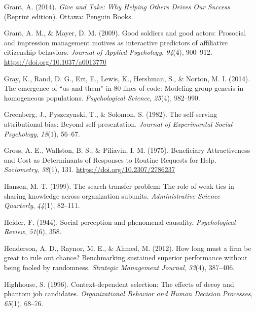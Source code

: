 \documentclass[english,,man]{apa6}
\begin{document}
\leavevmode\hypertarget{ref-grant_give_2014}{}%
Grant, A. (2014). \emph{Give and Take: Why Helping Others Drives Our Success} (Reprint edition). Ottawa: Penguin Books.

\leavevmode\hypertarget{ref-grant_good_2009}{}%
Grant, A. M., \& Mayer, D. M. (2009). Good soldiers and good actors: Prosocial and impression management motives as interactive predictors of affiliative citizenship behaviors. \emph{Journal of Applied Psychology}, \emph{94}(4), 900--912. \url{https://doi.org/10.1037/a0013770}

\leavevmode\hypertarget{ref-gray_emergence_2014}{}%
Gray, K., Rand, D. G., Ert, E., Lewis, K., Hershman, S., \& Norton, M. I. (2014). The emergence of ``us and them'' in 80 lines of code: Modeling group genesis in homogeneous populations. \emph{Psychological Science}, \emph{25}(4), 982--990.

\leavevmode\hypertarget{ref-greenberg_self-serving_1982}{}%
Greenberg, J., Pyszczynski, T., \& Solomon, S. (1982). The self-serving attributional bias: Beyond self-presentation. \emph{Journal of Experimental Social Psychology}, \emph{18}(1), 56--67.

\leavevmode\hypertarget{ref-gross_beneficiary_1975}{}%
Gross, A. E., Wallston, B. S., \& Piliavin, I. M. (1975). Beneficiary Attractiveness and Cost as Determinants of Responses to Routine Requests for Help. \emph{Sociometry}, \emph{38}(1), 131. \url{https://doi.org/10.2307/2786237}

\leavevmode\hypertarget{ref-hansen_search-transfer_1999}{}%
Hansen, M. T. (1999). The search-transfer problem: The role of weak ties in sharing knowledge across organization subunits. \emph{Administrative Science Quarterly}, \emph{44}(1), 82--111.

\leavevmode\hypertarget{ref-heider_social_1944}{}%
Heider, F. (1944). Social perception and phenomenal causality. \emph{Psychological Review}, \emph{51}(6), 358.

\leavevmode\hypertarget{ref-henderson_how_2012}{}%
Henderson, A. D., Raynor, M. E., \& Ahmed, M. (2012). How long must a firm be great to rule out chance? Benchmarking sustained superior performance without being fooled by randomness. \emph{Strategic Management Journal}, \emph{33}(4), 387--406.

\leavevmode\hypertarget{ref-highhouse_context-dependent_1996}{}%
Highhouse, S. (1996). Context-dependent selection: The effects of decoy and phantom job candidates. \emph{Organizational Behavior and Human Decision Processes}, \emph{65}(1), 68--76.
\end{document}
